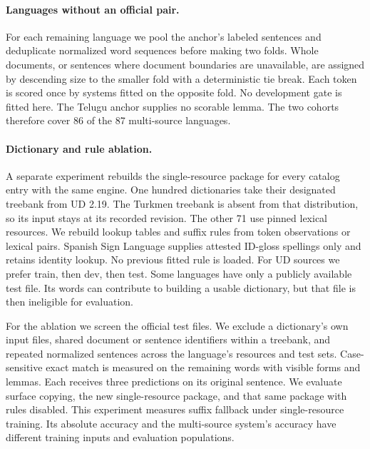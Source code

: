 \documentclass[11pt]{article}
\begin{document}
\paragraph{Languages without an official pair.}
For each remaining language we pool the anchor's labeled sentences and
deduplicate normalized word sequences before making two folds. Whole
documents, or sentences where document boundaries are unavailable, are
assigned by descending size to the smaller fold with a deterministic tie
break. Each token is scored once by systems fitted on the opposite fold.
No development gate is fitted here. The Telugu anchor supplies no scorable
lemma. The two cohorts therefore cover 86 of the 87 multi-source languages.

\paragraph{Dictionary and rule ablation.}
A separate experiment rebuilds the single-resource package for every catalog
entry with the same engine. One hundred dictionaries take their designated
treebank from UD 2.19. The Turkmen treebank is absent from that distribution,
so its input stays at its recorded revision. The other 71 use pinned lexical
resources. We rebuild lookup tables and suffix rules from token observations
or lexical pairs. Spanish Sign Language supplies attested ID-gloss spellings
only and retains identity lookup. No previous fitted rule is loaded.
For UD sources we prefer train, then dev, then test. Some languages have
only a publicly available test file. Its words can contribute to building
a usable dictionary, but that file is then ineligible for evaluation.

For the ablation we screen the \catAvailable{} official test files.
We exclude a dictionary's own input files, shared document or sentence
identifiers within a treebank, and repeated normalized sentences across
the language's resources and test sets. Case-sensitive exact match is
measured on the remaining words with visible forms and lemmas. Each
receives three predictions on its original sentence. We evaluate surface copying,
the new single-resource package, and that same package with rules disabled.
This experiment measures suffix fallback under single-resource training.
Its absolute accuracy and the multi-source system's accuracy have different
training inputs and evaluation populations.
\end{document}

